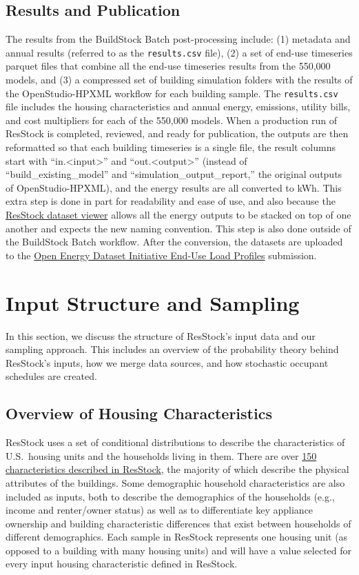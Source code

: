 \section{Results and Publication}
The results from the BuildStock Batch post-processing include: (1) metadata and annual results (referred to as the \texttt{results.csv} file), (2) a set of end-use timeseries parquet files that combine all the end-use timeseries results from the 550,000 models, and (3) a compressed set of building simulation folders with the results of the OpenStudio-HPXML workflow for each building sample. The \texttt{results.csv} file includes the housing characteristics and annual energy, emissions, utility bills, and cost multipliers for each of the 550,000 models. When a production run of ResStock is completed, reviewed, and ready for publication, the outputs are then reformatted so that each building timeseries is a single file, the result columns start with ``in.<input>'' and ``out.<output>'' (instead of ``build\_existing\_model'' and ``simulation\_output\_report,'' the original outputs of OpenStudio-HPXML), and the energy results are all converted to kWh. This extra step is done in part for readability and ease of use, and also because the \href{https://resstock.nrel.gov/datasets}{ResStock dataset viewer} allows all the energy outputs to be stacked on top of one another and expects the new naming convention. This step is also done outside of the BuildStock Batch workflow. After the conversion, the datasets are uploaded to the \href{https://data.openei.org/submissions/4520}{Open Energy Dataset Initiative End-Use Load Profiles} submission.

\chapter{Input Structure and Sampling} \label{sec:input_structure_and_sampling}
In this section, we discuss the structure of ResStock's input data and our sampling approach. This includes an overview of the probability theory behind ResStock's inputs, how we merge data sources, and how stochastic occupant schedules are created.


\section{Overview of Housing Characteristics} \label{hc_overview}
ResStock uses a set of conditional distributions to describe the characteristics of U.S.~housing units and the households living in them. There are over \href{https://github.com/NREL/resstock/tree/v3.3.0/project_national/housing_characteristics}{150 characteristics described in ResStock}, the majority of which describe the physical attributes of the buildings. Some demographic household characteristics are also included as inputs, both to describe the demographics of the households (e.g., income and renter/owner status) as well as to differentiate key appliance ownership and building characteristic differences that exist between households of different demographics. Each sample in ResStock represents one housing unit (as opposed to a building with many housing units) and will have a value selected for every input housing characteristic defined in ResStock. 

